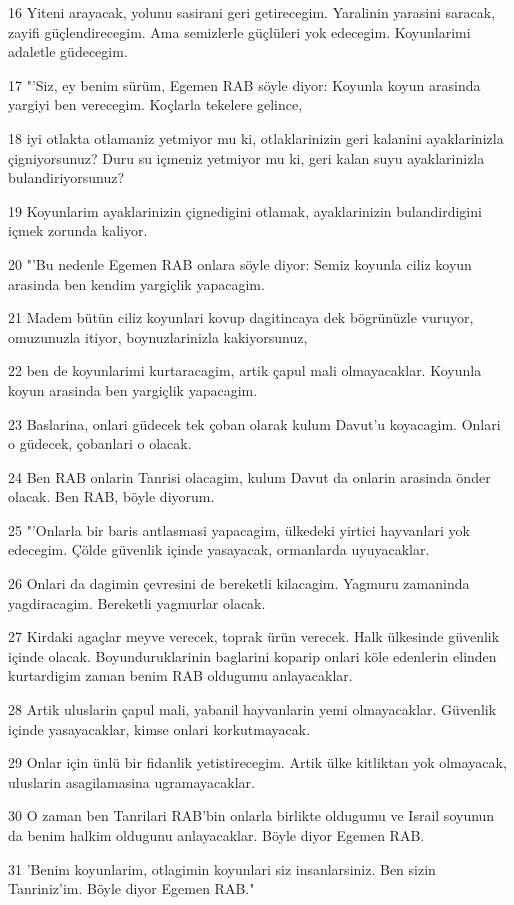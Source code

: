 \par 16 Yiteni arayacak, yolunu sasirani geri getirecegim. Yaralinin yarasini saracak, zayifi güçlendirecegim. Ama semizlerle güçlüleri yok edecegim. Koyunlarimi adaletle güdecegim.
\par 17 "'Siz, ey benim sürüm, Egemen RAB söyle diyor: Koyunla koyun arasinda yargiyi ben verecegim. Koçlarla tekelere gelince,
\par 18 iyi otlakta otlamaniz yetmiyor mu ki, otlaklarinizin geri kalanini ayaklarinizla çigniyorsunuz? Duru su içmeniz yetmiyor mu ki, geri kalan suyu ayaklarinizla bulandiriyorsunuz?
\par 19 Koyunlarim ayaklarinizin çignedigini otlamak, ayaklarinizin bulandirdigini içmek zorunda kaliyor.
\par 20 "'Bu nedenle Egemen RAB onlara söyle diyor: Semiz koyunla ciliz koyun arasinda ben kendim yargiçlik yapacagim.
\par 21 Madem bütün ciliz koyunlari kovup dagitincaya dek bögrünüzle vuruyor, omuzunuzla itiyor, boynuzlarinizla kakiyorsunuz,
\par 22 ben de koyunlarimi kurtaracagim, artik çapul mali olmayacaklar. Koyunla koyun arasinda ben yargiçlik yapacagim.
\par 23 Baslarina, onlari güdecek tek çoban olarak kulum Davut'u koyacagim. Onlari o güdecek, çobanlari o olacak.
\par 24 Ben RAB onlarin Tanrisi olacagim, kulum Davut da onlarin arasinda önder olacak. Ben RAB, böyle diyorum.
\par 25 "'Onlarla bir baris antlasmasi yapacagim, ülkedeki yirtici hayvanlari yok edecegim. Çölde güvenlik içinde yasayacak, ormanlarda uyuyacaklar.
\par 26 Onlari da dagimin çevresini de bereketli kilacagim. Yagmuru zamaninda yagdiracagim. Bereketli yagmurlar olacak.
\par 27 Kirdaki agaçlar meyve verecek, toprak ürün verecek. Halk ülkesinde güvenlik içinde olacak. Boyunduruklarinin baglarini koparip onlari köle edenlerin elinden kurtardigim zaman benim RAB oldugumu anlayacaklar.
\par 28 Artik uluslarin çapul mali, yabanil hayvanlarin yemi olmayacaklar. Güvenlik içinde yasayacaklar, kimse onlari korkutmayacak.
\par 29 Onlar için ünlü bir fidanlik yetistirecegim. Artik ülke kitliktan yok olmayacak, uluslarin asagilamasina ugramayacaklar.
\par 30 O zaman ben Tanrilari RAB'bin onlarla birlikte oldugumu ve Israil soyunun da benim halkim oldugunu anlayacaklar. Böyle diyor Egemen RAB.
\par 31 'Benim koyunlarim, otlagimin koyunlari siz insanlarsiniz. Ben sizin Tanriniz'im. Böyle diyor Egemen RAB."

